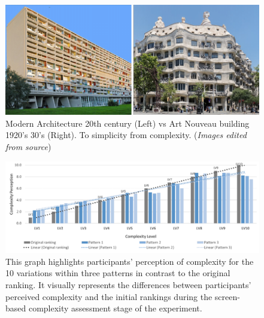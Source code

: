      \begin{figure}[htb]
          \centering
          \includegraphics[width= \linewidth]{Images/ArtNouveauVsModernism}
          \caption{Modern Architecture 20th century (Left) vs Art Nouveau building 1920's 30's (Right). To simplicity from complexity. (\textit{Images edited from source})}
          \label{fig:ArtNouveauVsModernism}
        \end{figure}



    \begin{figure}[htb]
      \centering
      \includegraphics[width= \linewidth, trim=0 0 0 0]{Images/ComplexityPerceptionPerLevel}
      \caption{This graph highlights participants' perception of complexity for the 10 variations within three patterns in contrast to the original ranking. It visually represents the differences between participants' perceived complexity and the initial rankings during the screen-based complexity assessment stage of the experiment.}
      \label{fig:ComplexityPerceptionPerLevel2}
    \end{figure}


